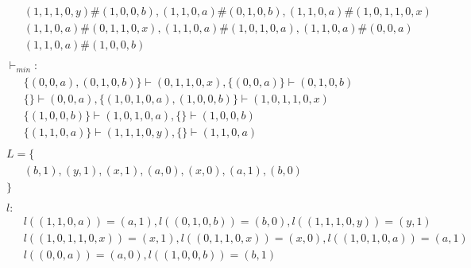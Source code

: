 \begin{align*}
	 & \qquad (1, 1, 1, 0, y) \# (1, 0, 0, b), (1, 1, 0, a) \# (0, 1, 0, b), (1, 1, 0, a) \# (1, 0, 1, 1, 0, x) \\ 
	 & \qquad (1, 1, 0, a) \# (0, 1, 1, 0, x), (1, 1, 0, a) \# (1, 0, 1, 0, a), (1, 1, 0, a) \# (0, 0, a) \\ 
	 & \qquad (1, 1, 0, a) \# (1, 0, 0, b) \\ 
	 & \ \  & \\ 
	 & \ \ \vdash_{{min}}: & \\ 
	 & \qquad \{ (0, 0, a), (0, 1, 0, b) \} \vdash (0, 1, 1, 0, x), \{ (0, 0, a) \} \vdash (0, 1, 0, b) \\ 
	 & \qquad \{  \} \vdash (0, 0, a), \{ (1, 0, 1, 0, a), (1, 0, 0, b) \} \vdash (1, 0, 1, 1, 0, x) \\ 
	 & \qquad \{ (1, 0, 0, b) \} \vdash (1, 0, 1, 0, a), \{  \} \vdash (1, 0, 0, b) \\ 
	 & \qquad \{ (1, 1, 0, a) \} \vdash (1, 1, 1, 0, y), \{  \} \vdash (1, 1, 0, a) \\ 
	 & \ \  & \\ 
	 & \ \ L=\{ & \\ 
	 & \qquad (b, 1), (y, 1), (x, 1), (a, 0), (x, 0), (a, 1), (b, 0) \\ 
	 & \ \ \} & \\ 
	 & \ \  & \\ 
	 & \ \ l: & \\ 
	 & \qquad l((1, 1, 0, a)) = (a, 1), l((0, 1, 0, b)) = (b, 0), l((1, 1, 1, 0, y)) = (y, 1) \\ 
	 & \qquad l((1, 0, 1, 1, 0, x)) = (x, 1), l((0, 1, 1, 0, x)) = (x, 0), l((1, 0, 1, 0, a)) = (a, 1) \\ 
	 & \qquad l((0, 0, a)) = (a, 0), l((1, 0, 0, b)) = (b, 1) \\ 
	 & \ \  & \\ 
\end{align*} 

